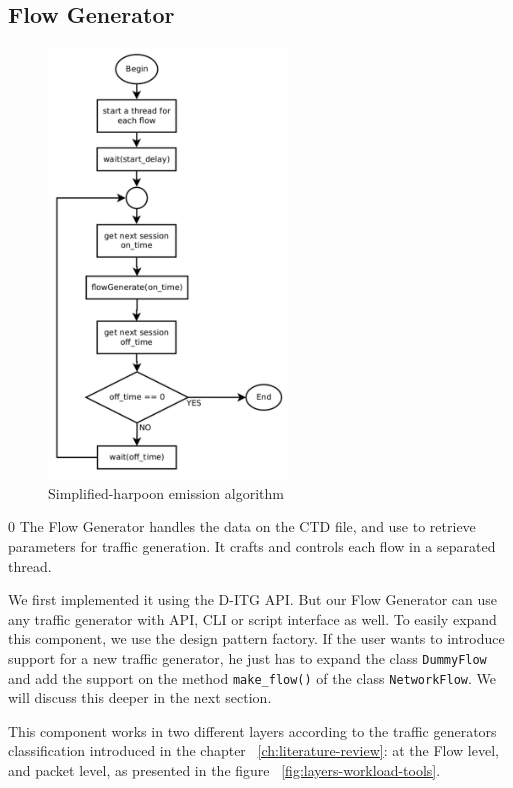 \subsection{Flow Generator}

\begin{figure}[ht!]
    \centering
    \includegraphics[height=4.5in]{figures/ch3/alg-simplified-harpoon}
    \caption{Simplified-harpoon emission algorithm}
    \label{fig:alg-simplified-harpoon}
\end{figure}
0
The Flow Generator handles the data on the CTD file, and use to retrieve parameters for traffic generation. It crafts and controls each flow in a separated thread. 

We first implemented it using the D-ITG API. But our Flow Generator can use any traffic generator with API, CLI or script interface as well. To easily expand this component, we use the design pattern factory. If the user wants to introduce support for a new traffic generator, he just has to expand the class \texttt{DummyFlow} and add the support on the method \texttt{make\_flow()} of the class \texttt{NetworkFlow}. We will discuss this deeper in the next section.

This component works in two different layers according to the traffic generators classification introduced in the chapter ~\ref{ch:literature-review}: at the Flow level, and packet level, as presented in the figure ~\ref{fig:layers-workload-tools}. 

